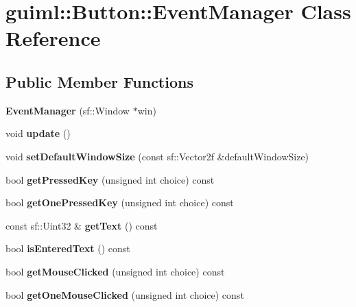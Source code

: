 \section{guiml\-:\-:Button\-:\-:Event\-Manager Class Reference}
\label{classguiml_1_1_button_1_1_event_manager}
\subsection*{Public Member Functions}
\begin{DoxyCompactItemize}
\item 
{\bfseries Event\-Manager} (sf\-::\-Window $\ast$win)\label{classguiml_1_1_button_1_1_event_manager_ae3f8b3bc1d93ebf4a0b9dc02cbc61fab}

\item 
void {\bfseries update} ()\label{classguiml_1_1_button_1_1_event_manager_aa229fc03d5d230811e9ca68323aabd3a}

\item 
void {\bfseries set\-Default\-Window\-Size} (const sf\-::\-Vector2f \&default\-Window\-Size)\label{classguiml_1_1_button_1_1_event_manager_a72d9566a6abdb65939de47d80c8b0719}

\item 
bool {\bfseries get\-Pressed\-Key} (unsigned int choice) const \label{classguiml_1_1_button_1_1_event_manager_ad9a1b8500100c70a39e5ec0922a03b3d}

\item 
bool {\bfseries get\-One\-Pressed\-Key} (unsigned int choice) const \label{classguiml_1_1_button_1_1_event_manager_a0e73bb2d40daa66895b30c71d6f1599a}

\item 
const sf\-::\-Uint32 \& {\bfseries get\-Text} () const \label{classguiml_1_1_button_1_1_event_manager_a3e1344e7101eaa273bb463b183705d16}

\item 
bool {\bfseries is\-Entered\-Text} () const \label{classguiml_1_1_button_1_1_event_manager_ae96b1c0eb86150193565652171831f4d}

\item 
bool {\bfseries get\-Mouse\-Clicked} (unsigned int choice) const \label{classguiml_1_1_button_1_1_event_manager_a3478810a7e172699465b11b2786b280c}

\item 
bool {\bfseries get\-One\-Mouse\-Clicked} (unsigned int choice) const \label{classguiml_1_1_button_1_1_event_manager_a77bf34b8733a12dec370622faa7bef55}


\end{DoxyCompactItemize}
